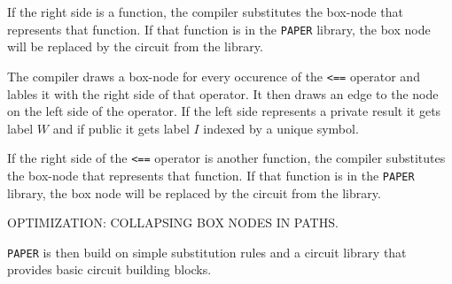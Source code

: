 If the right side is a function, the compiler substitutes the box-node that represents that function. If that function is in the \texttt{PAPER} library, the box node will be replaced by the circuit from the library. 

The compiler draws a box-node for every occurence of the \texttt{<==} operator and lables it with the right side of that operator. It then draws an edge to the node on the left side of the operator. If the left side represents a private result it gets label $W$ and if public it gets label $I$ indexed by a unique symbol.

If the right side of the \texttt{<==} operator is another function, the compiler substitutes the box-node that represents that function. If that function is in the \texttt{PAPER} library, the box node will be replaced by the circuit from the library. 

OPTIMIZATION: COLLAPSING BOX NODES IN PATHS.

\texttt{PAPER} is then build on simple substitution rules and a circuit library that provides basic circuit building blocks.  









